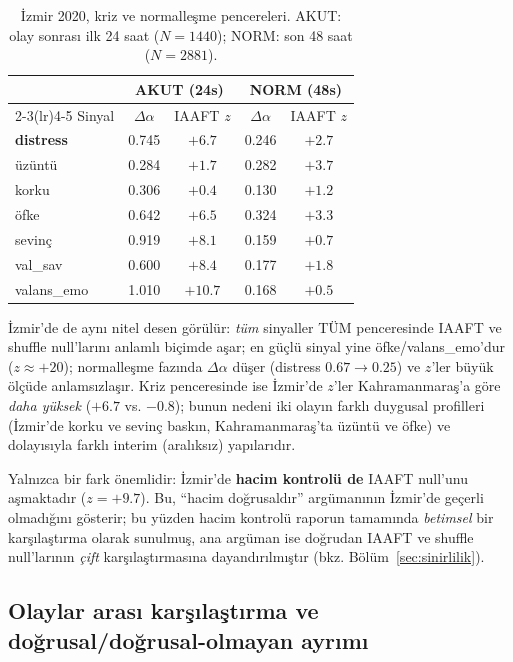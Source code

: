 \documentclass[11pt,a4paper]{article}
\newcommand{\Dal}{\Delta\alpha}
\begin{document}
\begin{table}[H]
\centering
\small
\caption{İzmir 2020, kriz ve normalleşme pencereleri. AKUT: olay sonrası ilk
24 saat ($N=1440$); NORM: son 48 saat ($N=2881$).}
\label{tab:izfaz}
\begin{tabular}{lcccc}
\toprule
& \multicolumn{2}{c}{AKUT (24s)} & \multicolumn{2}{c}{NORM (48s)}\\
\cmidrule(lr){2-3}\cmidrule(lr){4-5}
Sinyal & $\Dal$ & IAAFT $z$ & $\Dal$ & IAAFT $z$\\
\midrule
\textbf{distress} & 0.745 & $+6.7$ & 0.246 & $+2.7$\\
üzüntü           & 0.284 & $+1.7$ & 0.282 & $+3.7$\\
korku            & 0.306 & $+0.4$ & 0.130 & $+1.2$\\
öfke             & 0.642 & $+6.5$ & 0.324 & $+3.3$\\
sevinç           & 0.919 & $+8.1$ & 0.159 & $+0.7$\\
val\_sav         & 0.600 & $+8.4$ & 0.177 & $+1.8$\\
valans\_emo      & 1.010 & $+10.7$ & 0.168 & $+0.5$\\
\bottomrule
\end{tabular}
\end{table}

İzmir'de de aynı nitel desen görülür: \emph{tüm} sinyaller TÜM penceresinde
IAAFT ve shuffle null'larını anlamlı biçimde aşar; en güçlü sinyal yine
öfke/valans\_emo'dur ($z\approx +20$); normalleşme fazında $\Dal$ düşer
(distress $0.67 \to 0.25$) ve $z$'ler büyük ölçüde anlamsızlaşır. Kriz
penceresinde ise İzmir'de $z$'ler Kahramanmaraş'a göre \emph{daha yüksek}
($+6.7$ vs. $-0.8$); bunun nedeni iki olayın farklı duygusal profilleri
(İzmir'de korku ve sevinç baskın, Kahramanmaraş'ta üzüntü ve öfke) ve
dolayısıyla farklı interim (aralıksız) yapılarıdır.

Yalnızca bir fark önemlidir: İzmir'de \textbf{hacim kontrolü de} IAAFT null'unu
aşmaktadır ($z=+9.7$). Bu, ``hacim doğrusaldır'' argümanının İzmir'de
geçerli olmadığını gösterir; bu yüzden hacim kontrolü raporun tamamında
\emph{betimsel} bir karşılaştırma olarak sunulmuş, ana argüman ise doğrudan
IAAFT ve shuffle null'larının \emph{çift} karşılaştırmasına dayandırılmıştır
(bkz. Bölüm~\ref{sec:sinirlilik}).

\subsection{Olaylar arası karşılaştırma ve doğrusal/doğrusal-olmayan ayrımı}
\end{document}
